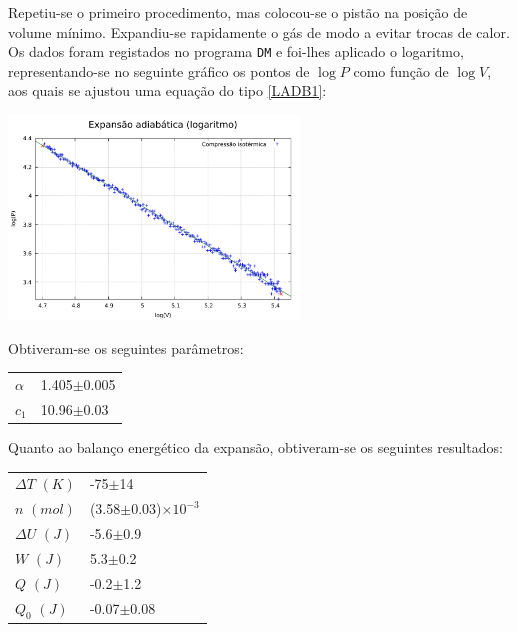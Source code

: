 \documentclass[9pt]{extarticle}
\begin{document}
\begin{multicols}{2}
\par Repetiu-se o primeiro procedimento, mas colocou-se o pistão na posição de volume mínimo. Expandiu-se rapidamente o gás de modo a evitar trocas de calor. Os dados foram registados no programa \verb|DM| e foi-lhes aplicado o logaritmo, representando-se no seguinte gráfico os pontos de $\log{P}$ como função de $\log{V}$, aos quais se ajustou uma equação do tipo \eqref{LADB1}:

\includegraphics[width=220pt]{lexp-adb.pdf}
\begin{center}
\par{}
\end{center}

\par Obtiveram-se os seguintes parâmetros:

\begin{center}
\begin{tabular}{ x{1cm} x{2.5cm} }
\hline \hline
$\alpha$ & 1.405$\pm$0.005 \tabularnewline
$c_1$ & 10.96$\pm$0.03 \tabularnewline
\hline \hline
\end{tabular}
\end{center}

\par Quanto ao balanço energético da expansão, obtiveram-se os seguintes resultados:

\begin{center}
\begin{tabular}{ x{2cm} x{3cm} }
\hline \hline
$\Delta T$ $(K)$ & -75$\pm$14 \tabularnewline
$n$ $(mol)$ & (3.58$\pm$0.03)$\times10^{-3}$ \tabularnewline
$\Delta U$ $(J)$ & -5.6$\pm$0.9 \tabularnewline
$W$ $(J)$ & 5.3$\pm$0.2 \tabularnewline
$Q$ $(J)$ & -0.2$\pm$1.2 \tabularnewline
$Q_0$ $(J)$ & -0.07$\pm$0.08 \tabularnewline
\hline \hline
\end{tabular}
\end{center}


\end{multicols}
\end{document}
